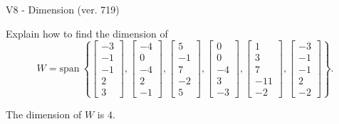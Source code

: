 \begin{exercise}
  \begin{exerciseTitle}V8 - Dimension (ver. 719)\end{exerciseTitle}
  \begin{exerciseStatement}
    Explain how to find the dimension of 
\[W=\mathrm{span}\ \left\{\left[\begin{array}{r}
-3 \\
-1 \\
-1 \\
2 \\
3
\end{array}\right] , \left[\begin{array}{r}
-4 \\
0 \\
-4 \\
2 \\
-1
\end{array}\right] , \left[\begin{array}{r}
5 \\
-1 \\
7 \\
-2 \\
5
\end{array}\right] , \left[\begin{array}{r}
0 \\
0 \\
-4 \\
3 \\
-3
\end{array}\right] , \left[\begin{array}{r}
1 \\
3 \\
7 \\
-11 \\
-2
\end{array}\right] , \left[\begin{array}{r}
-3 \\
-1 \\
-1 \\
2 \\
-2
\end{array}\right]\right\}.\]



  \end{exerciseStatement}
  \begin{exerciseAnswer}
   The dimension of \(W\) is  \(4\).
  


  \end{exerciseAnswer}
\end{exercise}
